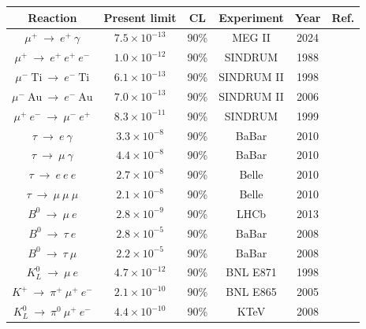 \begin{center}  
\begin{table}[!h]
\centering
\renewcommand{\arraystretch}{1.5}
\begin{tabular}{c c c c c c}
\hline
Reaction & Present limit & CL & Experiment &  Year & Ref.\\
\hline
$\mu^+\ \rightarrow \ e^+ \ \gamma$& $7.5 \times 10^{-13}$ & 90\% & MEG II & 2024 & \cite{megiicollaboration2024search}\\
$\mu^+ \ \rightarrow \ e^+ \ e^+ \ e^-$ & $1.0 \times 10^{-12}$ & 90\% & SINDRUM & 1988 & \cite{SINDRUM:1987nra} \\
$\mu^- \ \text{Ti}\ \rightarrow \ e^- \ \text{Ti}$ &  $6.1 \times 10^{-13}$ & 90\% & SINDRUM II & 1998 & \cite{titanium}\\
$\mu^- \ \text{Au}\ \rightarrow \ e^- \ \text{Au}$ & $7.0 \times 10^{-13}$ & 90\% & SINDRUM II & 2006 & \cite{SINDRUMII:2006dvw} \\
$\mu^+ \ e^- \ \rightarrow \ \mu^- \ e^+$ & $8.3 \times 10^{-11}$ & 90\% & SINDRUM & 1999 & \cite{Willmann:1998gd}\\
$\tau \ \rightarrow \ e \ \gamma$ & $3.3 \times 10^{-8}$ & 90\% & BaBar & 2010 & \cite{Aubert_2010}\\
$\tau \ \rightarrow \ \mu \ \gamma$ & $4.4 \times 10^{-8}$ & 90\% & BaBar & 2010 & \cite{Aubert_2010}\\
$\tau \ \rightarrow \ e \ e \  e$ & $2.7 \times 10^{-8}$ & 90\% & Belle & 2010 & \cite{Hayasaka_2010}\\
$\tau \ \rightarrow \ \mu \ \mu  \ \mu$ & $2.1 \times 10^{-8}$ & 90\% & Belle & 2010 & \cite{Hayasaka_2010} \\
\hline
$B^0 \ \rightarrow \ \mu \ e$ & $2.8 \times 10^{-9}$ & 90\% & LHCb & 2013 & \cite{PhysRevLett.111.141801}\\
$B^0 \ \rightarrow \ \tau \ e$ & $2.8 \times 10^{-5}$ & 90\% & BaBar & 2008 & \cite{PhysRevD.77.091104}\\
$B^0 \ \rightarrow \ \tau \ \mu$ & $2.2 \times 10^{-5}$ & 90\% & BaBar & 2008 & \cite{PhysRevD.77.091104}\\
$K_L^0 \ \rightarrow \ \mu \ e$ & $4.7 \times 10^{-12}$& 90\% & BNL E871 & 1998 & \cite{BNL:1998apv}\\
$K^+\ \rightarrow \ \pi^+ \ \mu^+ \ e^-$ & $2.1 \times 10^{-10} $ & 90\% & BNL E865 & 2005 & \cite{PhysRevD.72.012005}\\
$K_L^0 \ \rightarrow \ \pi^0 \ \mu^+ \ e^-$ & $ 4.4 \times 10^{-10}$ & 90\% & KTeV & 2008 & \cite{KTeV:2007cvy}\\

\end{tabular}
\end{table}
\end{center}
